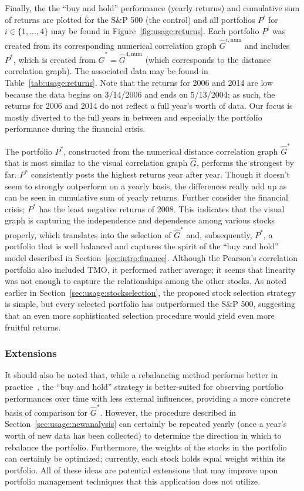 Finally, the the ``buy and hold'' performance (yearly returns) and cumulative 
sum of returns are plotted for the S\&P 500 (the control) and
all portfolios $P^i$ for $i \in \{1,...,4\}$ may be found in 
Figure~\ref{fig:usage:returns}. Each portfolio $P^i$ was created 
from its corresponding numerical correlation graph $\hat{G}^{i,\text{num}}$ and 
includes $P^*$, which is created from $\hat{G}^* = \hat{G}^{4,\text{num}}$ 
(which corresponds to the distance correlation graph). The associated 
data may be found in Table~\ref{tab:usage:returns}. Note 
that the returns for 2006 and 2014 are low because the data begins 
on 3/14/2006 and ends on 5/13/2004; as such, the returns for 2006 and 2014 do 
not reflect a full year's worth of data. Our focus is mostly diverted to the 
full years in between and especially the portfolio performance during the 
financial crisis. 

The portfolio $P^*$, constructed from the numerical distance correlation graph 
$\hat{G}^*$ that is most similar to the visual correlation graph $\hat{G}$, 
performs the strongest by far. $P^*$ consistently posts the highest returns 
year after year. Though it doesn't seem to strongly outperform on a yearly 
basis, the differences really add up as can be seen in cumulative sum of yearly 
returns. Further 
consider the financial crisis; $P^*$ has the least negative returns of 2008. 
This indicates that the visual graph is capturing the independence and 
dependence among various stocks properly, which translates into the selection 
of $\hat{G}^*$ and, subsequently, $P^*$, a portfolio that is well balanced and 
captures the spirit of the ``buy and hold'' model described in 
Section~\ref{sec:intro:finance}.
Although the Pearson's correlation portfolio also included TMO, it 
performed rather average; it seems that linearity was not enough to 
capture the relationships among the other stocks.
As noted earlier in Section~\ref{sec:usage:stockselection}, the proposed stock 
selection strategy is simple, but every selected portfolio has outperformed the 
S\&P 500, suggesting that an even more sophisticated selection procedure would 
yield even more fruitful returns.

\subsubsection{Extensions}

It should also be noted that, while a rebalancing method performs better in 
practice~\cite{liuh2016}, the ``buy and hold'' strategy is better-suited for 
observing portfolio performances over time with less external influences, 
providing a more concrete basis of comparison for $\hat{G}^*$. 
However, the procedure described in Section~\ref{sec:usage:newanalysis}
can certainly be repeated yearly (once a year's worth of new data has been 
collected) to determine the direction in which to 
rebalance the portfolio. Furthermore, the weights of the stocks in the 
portfolio can certainly be optimized; currently, each stock holds equal 
weight within its portfolio. All of these ideas are 
potential extensions that may improve upon portfolio management techniques that 
this application does not utilize.

